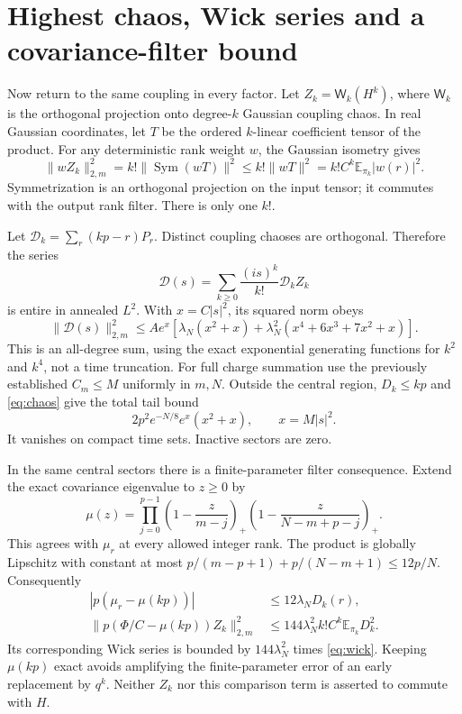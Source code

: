 \documentclass[11pt,a4paper]{article}
\newcommand{\EE}{\mathbb E}
\newcommand{\W}{\mathsf W}
\begin{document}
\newpage
\section{Highest chaos, Wick series and a covariance-filter bound}
Now return to the same coupling in every factor. Let
$Z_k=\W_k(H^k)$, where $\W_k$ is the orthogonal projection onto
degree-$k$ Gaussian coupling chaos. In real Gaussian coordinates,
let $T$ be the ordered $k$-linear coefficient tensor of the product.
For any deterministic rank weight $w$, the Gaussian isometry gives
\begin{equation}
 \|wZ_k\|_{2,m}^2=k!\|\operatorname{Sym}(wT)\|^2
 \le k!\|wT\|^2=k!C^k\EE_{\pi_k}|w(r)|^2.\label{eq:chaos}
\end{equation}
Symmetrization is an orthogonal projection on the input tensor;
it commutes with the output rank filter. There is only one $k!$.

Let $\mathcal D_k=\sum_r(kp-r)P_r$. Distinct coupling chaoses
are orthogonal. Therefore the series
\begin{equation}
 \mathcal D(s)=\sum_{k\ge0}\frac{(is)^k}{k!}\mathcal D_k Z_k
\end{equation}
is entire in annealed $L^2$. With $x=C|s|^2$, its squared norm obeys
\begin{equation}
 \|\mathcal D(s)\|_{2,m}^2\le A e^x
 \left[\lambda_N(x^2+x)
 +\lambda_N^2(x^4+6x^3+7x^2+x)\right].\label{eq:wick}
\end{equation}
This is an all-degree sum, using the exact exponential generating
functions for $k^2$ and $k^4$, not a time truncation.
For full charge summation use the previously established
$C_m\le M$ uniformly in $m,N$. Outside the central region,
$D_k\le kp$ and \eqref{eq:chaos} give the total tail bound
\begin{equation}
 2p^2e^{-N/8}e^x(x^2+x),\qquad x=M|s|^2.
\end{equation}
It vanishes on compact time sets. Inactive sectors are zero.

In the same central sectors there is a finite-parameter filter consequence. Extend the
exact covariance eigenvalue to $z\ge0$ by
\begin{equation}
 \mu(z)=\prod_{j=0}^{p-1}
 \left(1-\frac z{m-j}\right)_+
 \left(1-\frac z{N-m+p-j}\right)_+.
\end{equation}
This agrees with $\mu_r$ at every allowed integer rank. The product
is globally Lipschitz with constant at most
$p/(m-p+1)+p/(N-m+1)\le12p/N$. Consequently
\begin{align}
 |p(\mu_r-\mu(kp))|&\le12\lambda_ND_k(r),\\
 \|p(\Phi/C-\mu(kp))Z_k\|_{2,m}^2
 &\le144\lambda_N^2 k!C^k\EE_{\pi_k}D_k^2.\label{eq:filter}
\end{align}
Its corresponding Wick series is bounded by $144\lambda_N^2$
times \eqref{eq:wick}. Keeping $\mu(kp)$ exact avoids amplifying
the finite-parameter error of an early replacement by $q^k$.
Neither $Z_k$ nor this comparison term is asserted to commute with $H$.
\end{document}
